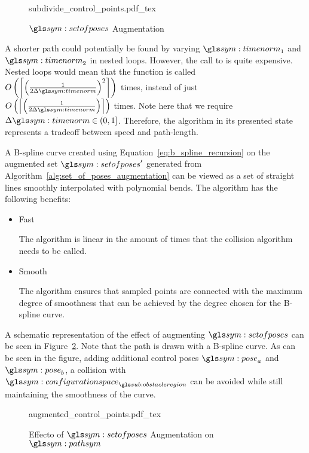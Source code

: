 		\begin{figure}[hbt]
			\centering
			\def\svgwidth{0.7\columnwidth}
			{subdivide_control_points.pdf_tex}
			\caption{$\setofposes$ Augmentation}%
			\label{fig:set_of_poses_augmentation}
		\end{figure}

		A shorter path could potentially be found by varying $\timenorm_1$ and
		$\timenorm_2$ in nested loops. However, the call to
		 is quite expensive. Nested loops
		would mean that the function is called
		\(
			O
			\left(
				\ceil*
				{%
					{%
						\left(
							\frac
							{%
								1
							}
							{%
								2\Delta\timenorm
							}
						\right)
					}^2
				}
			\right)
		\)
		times, instead of just
		\(
			O
			\left(
				\ceil*
				{%
					\left(
						\frac
						{%
							1
						}
						{%
							2\Delta\timenorm
						}
					\right)
				}
			\right)
		\)
		times. Note here that we require $\Delta\timenorm \in (0, 1]$.
		Therefore, the algorithm in its presented state represents a tradeoff
		between speed and path-length.

		A B-spline curve created using Equation~\ref{eq:b_spline_recursion} on
		the augmented set $\setofposes'$ generated from
		Algorithm~\ref{alg:set_of_poses_augmentation} can be viewed as a set of
		straight lines smoothly interpolated with polynomial bends. The
		algorithm has the following benefits:

		\begin{itemize}

			\item Fast

				The algorithm is linear in the amount of times that the
				collision algorithm needs to be called.

			\item Smooth

				The algorithm ensures that sampled points are connected with the
				maximum degree of smoothness that can be achieved by the degree
				chosen for the B-spline curve.
		\end{itemize}

		A schematic representation of the effect of augmenting $\setofposes$ can
		be seen in Figure~\ref{fig:set_of_poses_augmentation_path}. Note that
		the path is drawn with a B-spline curve. As can be seen in the figure,
		adding additional control poses $\pose_a$ and $\pose_b$, a collision
		with $\configurationspace_{\obstacleregion}$ can be avoided while still
		maintaining the smoothness of the curve.

		\begin{figure}[hb]
			\centering
			\def\svgwidth{\columnwidth}
			{augmented_control_points.pdf_tex}
			\caption{Effecto of $\setofposes$ Augmentation on $\pathsym$}
			\label{fig:set_of_poses_augmentation_path}
		\end{figure}
